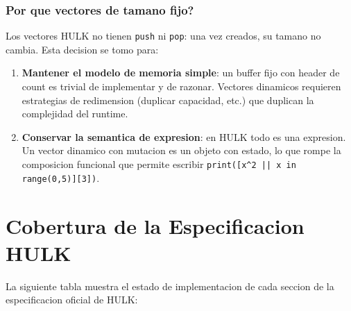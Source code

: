 \documentclass[12pt,a4paper]{article}
\begin{document}
\subsubsection{Por que vectores de tamano fijo?}

Los vectores HULK no tienen \texttt{push} ni \texttt{pop}: una vez creados, su tamano
no cambia. Esta decision se tomo para:

\begin{enumerate}
  \item \textbf{Mantener el modelo de memoria simple}: un buffer fijo con header de
    count es trivial de implementar y de razonar. Vectores dinamicos requieren
    estrategias de redimension (duplicar capacidad, etc.) que duplican la complejidad
    del runtime.
  \item \textbf{Conservar la semantica de expresion}: en HULK todo es una expresion.
    Un vector dinamico con mutacion es un objeto con estado, lo que rompe la
    composicion funcional que permite escribir \texttt{print([x\^{}2 || x in range(0,5)][3])}.
\end{enumerate}

\section{Cobertura de la Especificacion HULK}

La siguiente tabla muestra el estado de implementacion de cada seccion de la
especificacion oficial de HULK:
\end{document}

